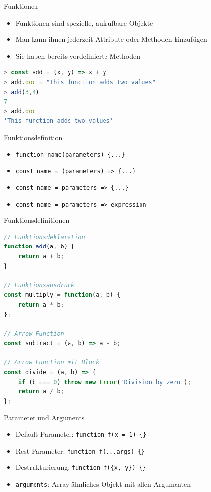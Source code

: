 \begin{definition}{Funktionen}
    \begin{itemize}
        \item Funktionen sind spezielle, aufrufbare Objekte
        \item Man kann ihnen jederzeit Attribute oder Methoden hinzufügen
        \item Sie haben bereits vordefinierte Methoden
      \end{itemize}
\begin{lstlisting}[language=JavaScript, style=basesmol]
> const add = (x, y) => x + y
> add.doc = "This function adds two values"
> add(3,4)
7
> add.doc
'This function adds two values'
\end{lstlisting}
\end{definition}

\begin{KR}{Funktionsdefinition}
    \begin{itemize}
        \item \texttt{function name(parameters) \{...\}}
        \item \texttt{const name = (parameters) => \{...\}}
        \item \texttt{const name = parameters => \{...\}}
        \item \texttt{const name = parameters => expression}
    \end{itemize}
\end{KR}

\begin{examplecode}{Funktionsdefinitionen}
\begin{lstlisting}[language=JavaScript, style=basesmol]
// Funktionsdeklaration
function add(a, b) {
    return a + b;
}

// Funktionsausdruck
const multiply = function(a, b) {
    return a * b;
};

// Arrow Function
const subtract = (a, b) => a - b;

// Arrow Function mit Block
const divide = (a, b) => {
    if (b === 0) throw new Error('Division by zero');
    return a / b;
};
\end{lstlisting}
\end{examplecode}

\begin{concept}{Parameter und Arguments}
    \begin{itemize}
        \item Default-Parameter: \texttt{function f(x = 1) \{\}}
        \item Rest-Parameter: \texttt{function f(...args) \{\}}
        \item Destrukturierung: \texttt{function f(\{x, y\}) \{\}}
        \item \texttt{arguments}: Array-ähnliches Objekt mit allen Argumenten
    \end{itemize}
\end{concept}

